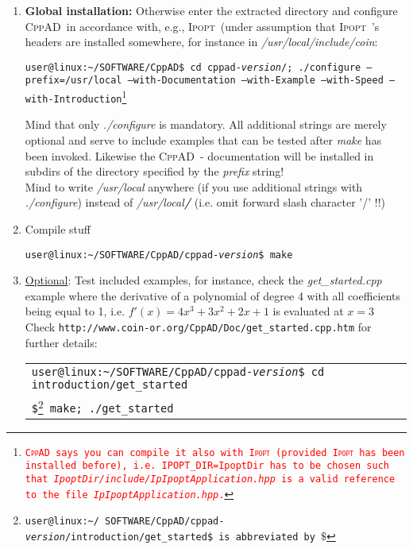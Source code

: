 \documentclass[a4paper,12pt]{article}
\makeatletter
\newcommand{\ipopt}{\textsc{Ipopt}\ }
\newcommand{\tbase}{\texttt{user@linux:\textasciitilde/}}
\newcommand{\cppad}{\textsc{CppAD}\ }
\newcommand{\dyeitred}{\textcolor{red}}{}
\makeatother
\begin{document}
\begin{enumerate}
 \item \textbf{Global installation:} Otherwise enter the extracted directory and configure \cppad in
   accordance with, e.g., \ipopt (under assumption that \ipopt's headers are
   installed somewhere, for instance in \textit{/usr/local/include/coin}:
   \begin{center}
     \texttt{\tbase SOFTWARE/CppAD\$ cd cppad-\textit{version}/; ./configure
       --prefix=/usr/local  --with-Documentation --with-Example --with-Speed
       --with-Introduction\dyeitred{\footnote{\dyeitred{\cppad says you can compile it
           also with \ipopt (provided \ipopt has been installed before),
           i.e. \texttt{IPOPT\_DIR=IpoptDir} has to be chosen such that
           \textit{IpoptDir/include/IpIpoptApplication.hpp} is a valid
           reference to the file \textit{IpIpoptApplication.hpp}.}}}}
    \end{center}
   \Stopsign Mind that only \textit{./configure} is mandatory. All additional
   strings are merely optional and serve to include examples that can be
   tested after \textit{make} has been invoked. Likewise the \cppad -
   documentation will be installed in subdirs of the directory specified by
   the \textit{prefix} string!\\
   \Stopsign Mind to write \textit{/usr/local} anywhere (if you use additional
   strings with \textit{./configure}) instead of
   \textit{/usr/local\textbf{/}} (i.e. omit forward slash character '/' !!)
 \item Compile stuff 
   \begin{center}
     \texttt{\tbase SOFTWARE/CppAD/cppad-\textit{version}\$ make}
     \end{center}
  \newpage
  \item \underline{Optional}: Test included examples, for instance, check the
    \textit{get\_started.cpp} example where the derivative of a polynomial of
    degree 4 with all coefficients being equal to 1, i.e. $f'(x) = 4x^3+3x^2+2x+1$ is evaluated at $x = 3$\\ Check
    \texttt{http://www.coin-or.org/CppAD/Doc/get\_started.cpp.htm} for further
    details:
    \begin{center}
   \begin{tabular}{l} 
     \texttt{\tbase SOFTWARE/CppAD/cppad-\textit{version}\$ cd
       introduction/get\_started}\\
     \texttt{\$\footnote{\texttt{\tbase
           SOFTWARE/CppAD/cppad-\textit{version}/introduction/get\_started\$
           is abbreviated by $\$$}} make; ./get\_started}
        

\end{tabular}
\end{center}
\end{enumerate}
\end{document}
